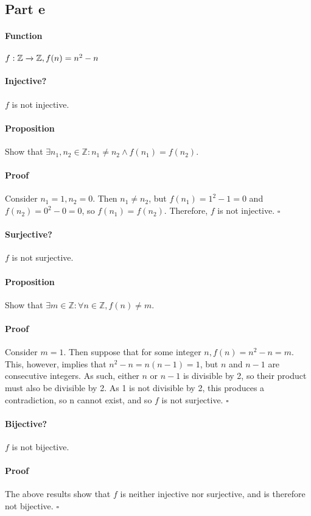 \documentclass{article}
\begin{document}
\subsection{Part e}
{
\paragraph{Function}$f:\mathbb{Z}\xrightarrow{}\mathbb{Z}, f(n)=n^2-n$
{
\paragraph{Injective?}
$f$ is not injective.
\vspace{-10pt}
\paragraph{Proposition}
Show that $\exists n_1, n_2 \in \mathbb{Z}: n_1 \neq n_2 \land f(n_1) = f(n_2)$.
\vspace{-10pt}
\paragraph{Proof}
Consider $n_1 = 1, n_2 = 0$. Then $n_1 \neq n_2$, but $f(n_1) = 1^2-1 = 0$ and $f(n_2) = 0^2-0 = 0$, so $f(n_1) = f(n_2)$. Therefore, $f$ is not injective. $\square$
}
{
\paragraph{Surjective?}
$f$ is not surjective.
\vspace{-10pt}
\paragraph{Proposition}
Show that $\exists m \in \mathbb{Z}: \forall n \in \mathbb{Z}, f(n) \neq m$.
\vspace{-10pt}
\paragraph{Proof}
Consider $m=1$. Then suppose that for some integer $n, f(n) = n^2-n = m$. This, however, implies that $n^2-n = n(n-1) = 1$, but $n$ and $n-1$ are consecutive integers. As such, either $n$ or $n-1$ is divisible by 2, so their product must also be divisible by 2. As 1 is not divisible by 2, this produces a contradiction, so n cannot exist, and so $f$ is not surjective. $\square$
}
{
\paragraph{Bijective?}
$f$ is not bijective.
\vspace{-10pt}
\paragraph{Proof}
The above results show that $f$ is neither injective nor surjective, and is therefore not bijective. $\square$
}
}
\end{document}
